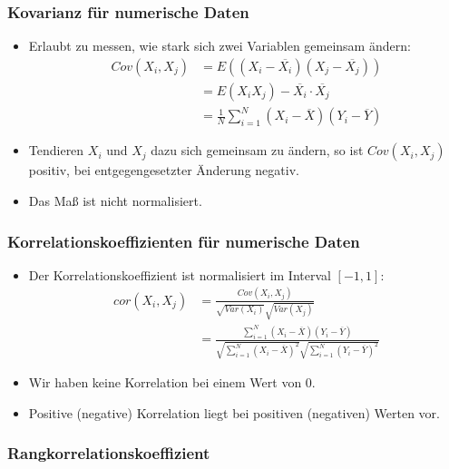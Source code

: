 \documentclass{scrartcl}
\begin{document}
\subsubsection{Kovarianz für numerische Daten}

\begin{itemize}
	\item Erlaubt zu messen, wie stark sich zwei Variablen gemeinsam ändern:
	\begin{align*}
		Cov(X_i,X_j) &= E((X_i - \overline{X_i})(X_j - \overline{X_j})) \\
		&= E(X_iX_j) - \overline{X_i} \cdot \overline{X_j} \\
		&= \frac{1}{N} \sum_{i=1}^{N} (X_i - \overline{X})(Y_i - \overline{Y})
	\end{align*}
	\item Tendieren $ X_i $ und $ X_j $ dazu sich gemeinsam zu ändern, so ist $ 
	Cov(X_i,X_j) $ positiv, bei entgegengesetzter Änderung negativ.
	\item Das Maß ist nicht normalisiert.
\end{itemize}

\subsubsection{Korrelationskoeffizienten für numerische Daten}

\begin{itemize}
	\item Der Korrelationskoeffizient ist normalisiert im Interval $ [-1,1] $:
	\begin{align*}
		cor(X_i,X_j) &= \frac{Cov(X_i,X_j)}{\sqrt{Var(X_i)} \sqrt{Var(X_j)}} \\
		&= \frac{\sum_{i=1}^{N} (X_i - \overline{X})(Y_i - 
		\overline{Y})}{\sqrt{\sum_{i=1}^{N} (X_i - \overline{X})^2} 
		\sqrt{\sum_{i=1}^{N} (Y_i - \overline{Y})^2}}
	\end{align*}
	\item Wir haben keine Korrelation bei einem Wert von 0.
	\item Positive (negative) Korrelation liegt bei positiven (negativen) 
	Werten vor.
\end{itemize}

\subsubsection{Rangkorrelationskoeffizient}
\end{document}

